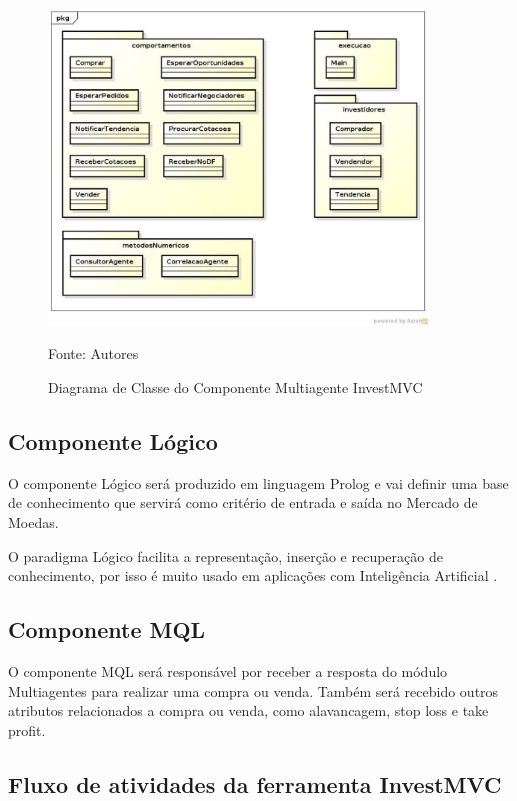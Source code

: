 \begin{figure}[htp]
\centering
\includegraphics[width=0.9\textwidth]{figuras/diagramaClassesSMA}
\caption{Diagrama de Classe do Componente Multiagente InvestMVC}{Fonte: Autores} 
\label{diagramaClassesSMA}
\end{figure}

\subsection{Componente Lógico}

O componente Lógico será produzido em linguagem Prolog e vai definir uma base de conhecimento que servirá como critério de entrada e saída no Mercado de Moedas.

O paradigma Lógico facilita a representação, inserção e recuperação de conhecimento, por isso é muito usado em aplicações com Inteligência Artificial \cite{almeida2010}.

\subsection{Componente MQL}

O componente MQL será responsável por receber a resposta do módulo Multiagentes para realizar uma compra ou venda. Também será recebido outros atributos relacionados a compra ou venda, como alavancagem, stop loss e take profit.

\subsection{Fluxo de atividades  da ferramenta InvestMVC}

